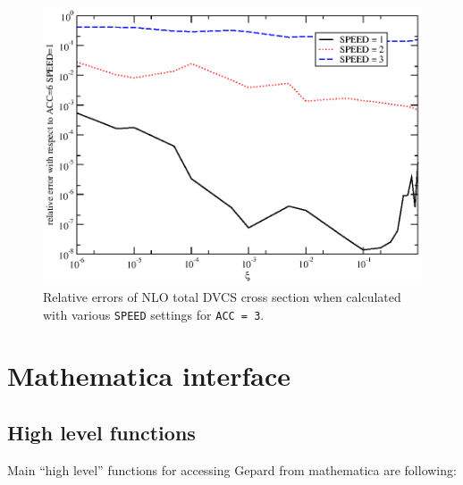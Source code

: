 \documentclass[12pt]{article}
\begin{document}
\begin{figure}
\begin{center}
\includegraphics[scale=0.8]{acc}
\end{center}
\caption{Relative errors of NLO total DVCS cross section when calculated with various
\texttt{SPEED} settings for \texttt{ACC = 3}.}
\label{fig:acc}
\end{figure}



\section{Mathematica interface}
\label{sec:mma}


\subsection{High level functions}

Main ``high level'' functions for accessing Gepard from mathematica are following:
\end{document}
